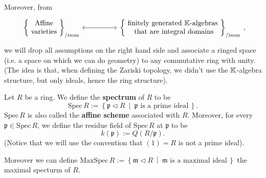 Moreover, from
	\begin{equation}
	\begin{tikzcd}[row sep=tiny]
			\left\{\begin{matrix}
				\text{ Affine }\\
				\text{ varieties }
			\end{matrix}\right\}_{/ \text{isom}}
			\arrow[rr, "", leftrightarrow] & &
			\left\{  \begin{matrix}
				\text{ finitely generated } \K\text{-algebras }\\
				\text{ that are integral domains}
			\end{matrix}\right\}_{/ \text{isom}}
	\end{tikzcd}
	,\end{equation} 
we will drop all assumptions on the right hand side
and associate a ringed space (i.e. a space on which we can do geometry)
to any commutative ring with unity.
(The idea is that, when defining the Zariski topology, we didn't use the $\mathbb{K}$-algebra
structure, but only ideals, hence the ring structure).

\begin{defn}
	Let $R$ be a ring.
	We define the \textbf{spectrum} of $R$ to be
	\begin{equation}
	\mathrm{Spec}\, R := \left\{ \mathfrak{p} \triangleleft R \ \middle|\ 
	\mathfrak{p} \text{ is a prime ideal}\, \right\}
	.\end{equation} 
	$\mathrm{Spec}\, R$ is also called the \textbf{affine scheme} associated with $R$.
	Moreover, for every $\mathfrak{p} \in \mathrm{Spec}\, R$, we define the residue field
	of $\mathrm{Spec}\, R$ at $\mathfrak{p}$ to be
	\begin{equation}
	k(\mathfrak{p}) := Q \left( R/\mathfrak{p} \right)
	.\end{equation} 
	(Notice that we will use the convention that $(1) = R$ is not a prime ideal).

	Moreover we can define $\mathrm{MaxSpec}\, R := \left\{ \mathfrak{m} \triangleleft R \ \middle|\ 
	\mathfrak{m} \text{ is a maximal ideal}\, \right\}$ the maximal specturm of $R$.
\end{defn}

